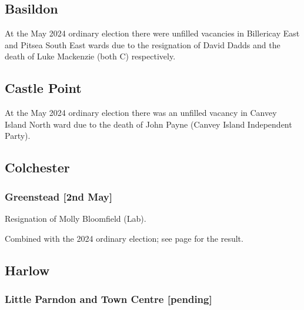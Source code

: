 \documentclass[a4paper,openany]{book}
\begin{document}
\begin{resultsiii}
\subsection*{Basildon}

At the May 2024 ordinary election there were unfilled vacancies in Billericay East and Pitsea South East wards due to the resignation of David Dadds and the death of Luke Mackenzie (both C) respectively.%

\subsection*{Castle Point}

At the May 2024 ordinary election there was an unfilled vacancy in Canvey Island North ward due to the death of John Payne (Canvey Island Independent Party).%

\subsection*{Colchester}

\subsubsection*{Greenstead \hspace*{\fill}\nolinebreak[1]%
	\enspace\hspace*{\fill}
	[2nd May]}


Resignation of Molly Bloomfield (Lab).

Combined with the 2024 ordinary election; see page \pageref{ColchesterGreenstead} for the result.

\subsection*{Harlow}

\subsubsection*{Little Parndon and Town Centre \hspace*{\fill}\nolinebreak[1]%
	\enspace\hspace*{\fill}
	[pending]}


\end{resultsiii}
\end{document}
